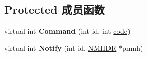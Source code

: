 \subsection*{Protected 成员函数}
\begin{DoxyCompactItemize}
\item 
\mbox{\label{struct_desktop_settings_dlg_a7bebf411819f3d9a87ea4d233e1d30d6}} 
virtual int {\bfseries Command} (int id, int \hyperlink{structcode}{code})
\item 
\mbox{\label{struct_desktop_settings_dlg_aeeb28ed3cdf5581869c10af97c6d0ad9}} 
virtual int {\bfseries Notify} (int id, \hyperlink{structtag_n_m_h_d_r}{N\+M\+H\+DR} $\ast$pnmh)
\end{DoxyCompactItemize}
